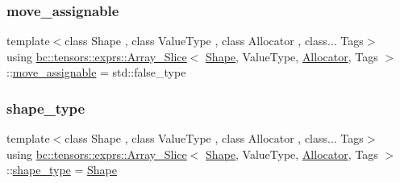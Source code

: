 \subsubsection{\texorpdfstring{move\+\_\+assignable}{move\_assignable}}
{\footnotesize\ttfamily template$<$class Shape , class Value\+Type , class Allocator , class... Tags$>$ \\
using \hyperlink{classbc_1_1tensors_1_1exprs_1_1Array__Slice}{bc\+::tensors\+::exprs\+::\+Array\+\_\+\+Slice}$<$ \hyperlink{structbc_1_1Shape}{Shape}, Value\+Type, \hyperlink{classbc_1_1allocators_1_1Allocator}{Allocator}, Tags $>$\+::\hyperlink{classbc_1_1tensors_1_1exprs_1_1Array__Slice_a3cf7241b4d83d7821c9e11ee5c22e570}{move\+\_\+assignable} =  std\+::false\+\_\+type}

\mbox{\label{classbc_1_1tensors_1_1exprs_1_1Array__Slice_a32cb548eb3216c642a3a1f45e8b44919}} 
\subsubsection{\texorpdfstring{shape\+\_\+type}{shape\_type}}
{\footnotesize\ttfamily template$<$class Shape , class Value\+Type , class Allocator , class... Tags$>$ \\
using \hyperlink{classbc_1_1tensors_1_1exprs_1_1Array__Slice}{bc\+::tensors\+::exprs\+::\+Array\+\_\+\+Slice}$<$ \hyperlink{structbc_1_1Shape}{Shape}, Value\+Type, \hyperlink{classbc_1_1allocators_1_1Allocator}{Allocator}, Tags $>$\+::\hyperlink{classbc_1_1tensors_1_1exprs_1_1Array__Slice_a32cb548eb3216c642a3a1f45e8b44919}{shape\+\_\+type} =  \hyperlink{structbc_1_1Shape}{Shape}}

\mbox{\label{classbc_1_1tensors_1_1exprs_1_1Array__Slice_a73ab693dcce17b3bf37747b2e91a2fb2}} 
